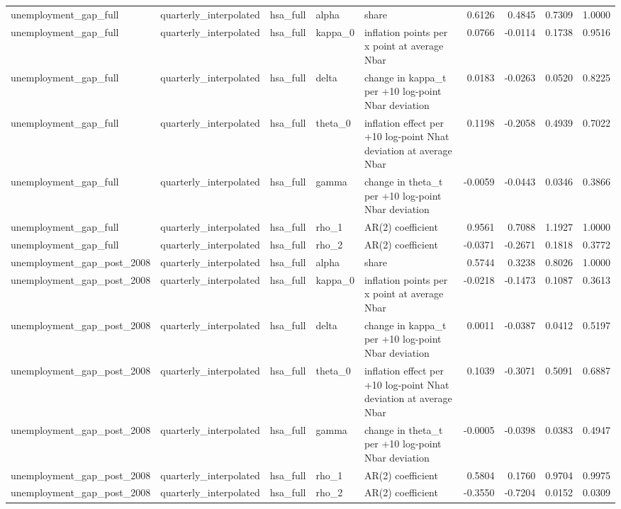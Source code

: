 \begin{tabular}{lllllrrrr}
unemployment\_gap\_full & quarterly\_interpolated & hsa\_full & alpha & share & 0.6126 & 0.4845 & 0.7309 & 1.0000 \\
unemployment\_gap\_full & quarterly\_interpolated & hsa\_full & kappa\_0 & inflation points per x point at average Nbar & 0.0766 & -0.0114 & 0.1738 & 0.9516 \\
unemployment\_gap\_full & quarterly\_interpolated & hsa\_full & delta & change in kappa\_t per +10 log-point Nbar deviation & 0.0183 & -0.0263 & 0.0520 & 0.8225 \\
unemployment\_gap\_full & quarterly\_interpolated & hsa\_full & theta\_0 & inflation effect per +10 log-point Nhat deviation at average Nbar & 0.1198 & -0.2058 & 0.4939 & 0.7022 \\
unemployment\_gap\_full & quarterly\_interpolated & hsa\_full & gamma & change in theta\_t per +10 log-point Nbar deviation & -0.0059 & -0.0443 & 0.0346 & 0.3866 \\
unemployment\_gap\_full & quarterly\_interpolated & hsa\_full & rho\_1 & AR(2) coefficient & 0.9561 & 0.7088 & 1.1927 & 1.0000 \\
unemployment\_gap\_full & quarterly\_interpolated & hsa\_full & rho\_2 & AR(2) coefficient & -0.0371 & -0.2671 & 0.1818 & 0.3772 \\
unemployment\_gap\_post\_2008 & quarterly\_interpolated & hsa\_full & alpha & share & 0.5744 & 0.3238 & 0.8026 & 1.0000 \\
unemployment\_gap\_post\_2008 & quarterly\_interpolated & hsa\_full & kappa\_0 & inflation points per x point at average Nbar & -0.0218 & -0.1473 & 0.1087 & 0.3613 \\
unemployment\_gap\_post\_2008 & quarterly\_interpolated & hsa\_full & delta & change in kappa\_t per +10 log-point Nbar deviation & 0.0011 & -0.0387 & 0.0412 & 0.5197 \\
unemployment\_gap\_post\_2008 & quarterly\_interpolated & hsa\_full & theta\_0 & inflation effect per +10 log-point Nhat deviation at average Nbar & 0.1039 & -0.3071 & 0.5091 & 0.6887 \\
unemployment\_gap\_post\_2008 & quarterly\_interpolated & hsa\_full & gamma & change in theta\_t per +10 log-point Nbar deviation & -0.0005 & -0.0398 & 0.0383 & 0.4947 \\
unemployment\_gap\_post\_2008 & quarterly\_interpolated & hsa\_full & rho\_1 & AR(2) coefficient & 0.5804 & 0.1760 & 0.9704 & 0.9975 \\
unemployment\_gap\_post\_2008 & quarterly\_interpolated & hsa\_full & rho\_2 & AR(2) coefficient & -0.3550 & -0.7204 & 0.0152 & 0.0309 \\

\end{tabular}

